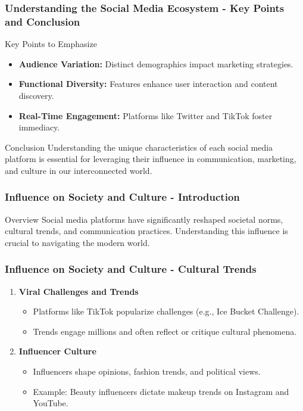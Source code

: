 \documentclass{beamer}
\begin{document}
\begin{frame}[fragile]
    \frametitle{Understanding the Social Media Ecosystem - Key Points and Conclusion}
    \begin{block}{Key Points to Emphasize}
        \begin{itemize}
            \item \textbf{Audience Variation:} Distinct demographics impact marketing strategies.
            \item \textbf{Functional Diversity:} Features enhance user interaction and content discovery.
            \item \textbf{Real-Time Engagement:} Platforms like Twitter and TikTok foster immediacy.
        \end{itemize}
    \end{block}

    \begin{block}{Conclusion}
        Understanding the unique characteristics of each social media platform is essential for leveraging their influence in communication, marketing, and culture in our interconnected world.
    \end{block}
\end{frame}

\begin{frame}[fragile]
    \frametitle{Influence on Society and Culture - Introduction}
    \begin{block}{Overview}
        Social media platforms have significantly reshaped societal norms, cultural trends, and communication practices.
        Understanding this influence is crucial to navigating the modern world.
    \end{block}
\end{frame}

\begin{frame}[fragile]
    \frametitle{Influence on Society and Culture - Cultural Trends}
    \begin{enumerate}
        \item \textbf{Viral Challenges and Trends}
        \begin{itemize}
            \item Platforms like TikTok popularize challenges (e.g., Ice Bucket Challenge).
            \item Trends engage millions and often reflect or critique cultural phenomena.
        \end{itemize}
        
        \item \textbf{Influencer Culture}
        \begin{itemize}
            \item Influencers shape opinions, fashion trends, and political views.
            \item Example: Beauty influencers dictate makeup trends on Instagram and YouTube.
        \end{itemize}
    \end{enumerate}
\end{frame}
\end{document}
